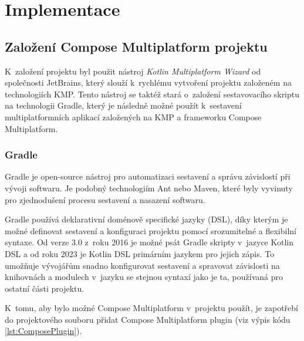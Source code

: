 \chapter{Implementace}


\section{Založení Compose Multiplatform projektu}
K~založení projektu byl použit nástroj \textit{Kotlin Multiplatform Wizard} od společnosti JetBrains, který slouží k~rychlému vytvoření projektu
založeném na technologiích KMP. Tento nástroj se taktéž stará o~založení sestavovacího skriptu na technologii Gradle, který je následně možné 
použít k~sestavení multiplatformních aplikací založených na KMP a frameworku Compose Multiplatform.
 
 



%

\subsection{Gradle} \label{gradleChapter}
Gradle je open-source nástroj pro automatizaci sestavení a správu závislostí při vývoji softwaru. Je 
podobný technologiím Ant nebo Maven, které byly vyvinuty pro zjednodušení procesu sestavení a nasazení softwaru.

Gradle používá deklarativní doménově specifické jazyky (DSL), díky kterým je možné definovat sestavení a konfiguraci projektu pomocí srozumitelné
a flexibilní syntaxe. Od verze 3.0 z~roku 2016 je možné psát Gradle skripty v~jazyce Kotlin DSL a od roku 2023 je Kotlin DSL primárním jazykem 
pro jejich zápis. To umožňuje vývojářům snadno konfigurovat sestavení a spravovat závislosti na knihovnách a modulech v~jazyku se stejnou
syntaxí jako je ta, používaná pro ostatní části projektu. 



K~tomu, aby bylo možné Compose Multiplatform v~projektu použít, je zapotřebí do projektového souboru  přidat Compose 
Multiplatform plugin (viz výpis kódu \ref{lst:ComposePlugin}).

